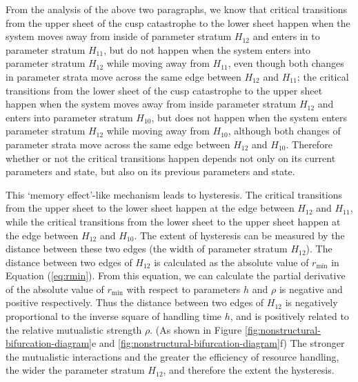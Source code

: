 \documentclass[a4paper,fleqn,12pt]{article}
\begin{document}
From the analysis of the above two paragraphs, we know that critical transitions from the upper sheet of the cusp catastrophe to the lower sheet happen when the system moves away from inside of parameter stratum $H_{12}$ and enters in to parameter stratum $H_{11}$,
but do not happen when the system enters into parameter stratum $H_{12}$ while moving away from $H_{11}$,
even though both changes in parameter strata move across the same edge between $H_{12}$ and $H_{11}$;
the critical transitions from the lower sheet of the cusp catastrophe to the upper sheet happen when the system moves away from inside parameter stratum $H_{12}$ and enters into parameter stratum $H_{10}$,
but does not happen when the system enters parameter stratum $H_{12}$ while moving away from $H_{10}$,
although both changes of parameter strata move across the same edge between $H_{12}$ and $H_{10}$.
Therefore whether or not the critical transitions happen depends not only on its current parameters and state, but also on its previous parameters and state.




This `memory effect'-like mechanism leads to hysteresis.
The critical transitions from the upper sheet to the lower sheet happen at the edge between $H_{12}$ and $H_{11}$,
while the critical transitions from the lower sheet to the upper sheet happen at the edge between $H_{12}$ and $H_{10}$.
The extent of hysteresis can be measured by the distance between these two edges (the width of parameter stratum $H_{12}$). 
The distance between two edges of $H_{12}$ is calculated as the absolute value of $r_{\mathrm{min}}$ in Equation (\ref{eq:rmin}).
From this equation, we can calculate the partial derivative of the absolute value of $r_{\mathrm{min}}$ with respect to parameters $h$  and $\rho$ is negative and positive respectively.
Thus the distance between two edges of $H_{12}$ is negatively proportional to the inverse square of handling time $h$, and is positively related to the relative mutualistic strength $\rho$.
(As shown in Figure \ref{fig:nonstructural-bifurcation-diagram}e and \ref{fig:nonstructural-bifurcation-diagram}f)
The stronger the mutualistic interactions and the greater the efficiency of resource handling, the wider the parameter stratum $H_{12}$, and therefore the extent the hysteresis.
\end{document}

